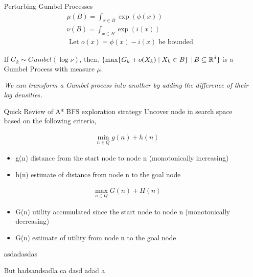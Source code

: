 
\begin{frame}{Perturbing Gumbel Processes} %
  \begin{align*}
    & \mu(B) = \int_{x\in B} \exp(\phi(x)) \tag{hard}\\
    & \nu(B)=\int_{x\in B} \exp(i(x)) \tag{easy}\\
    & \text{ Let $o(x) = \phi(x) - i(x)$ be bounded}
  \end{align*}
  \pause
  \begin{property}
    If $G_k \sim Gumbel(\log\nu)$, then, $\{\max\{G_k + o(X_k) \mid X_k \in B\} \mid B \subseteq \operatorname{\mathbb{R}}^d\}$ is a Gumbel Process with measure $\mu$.
  \end{property}
  \pause
  \emph{We can transform a Gumbel process into another by adding the difference of their log densities.} \\
\end{frame}


\begin{frame}{Quick Review of A*}
  BFS exploration strategy
  Uncover node in search space based on the following criteria,
  \begin{overprint}
    \begin{align*}
      \min_{n \in Q} g(n) + h(n)
    \end{align*}

    \begin{itemize}
    \item g(n) distance from the start node to node n (monotonically increasing)
    \item h(n) estimate of distance from node n to the goal node
    \end{itemize}
    \begin{align*}
      \max_{n \in Q} G(n) + H(n)
    \end{align*}

    \begin{itemize}
    \item G(n) utility accumulated since the start node to node n (monotonically decreasing)
    \item G(n) estimate of utility from node n to the goal node
    \end{itemize}
    
  \end{overprint}
\end{frame}
\begin{frame}
   {asdadasdas}

      {
        But
        hadsandsadla ca
        dasd
        adad
        a}
\end{frame}


